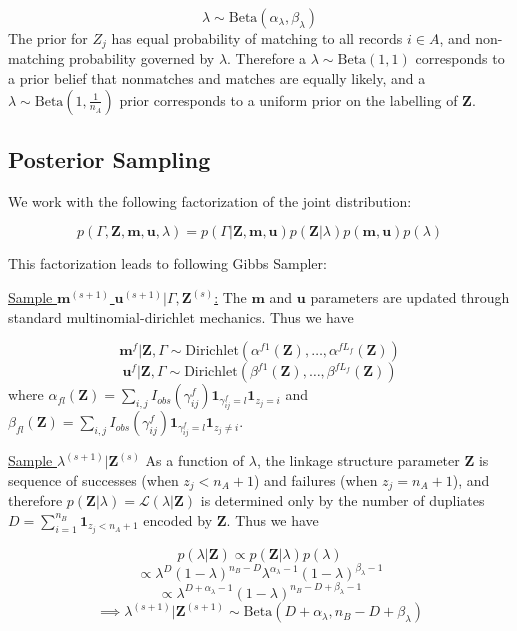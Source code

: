 \documentclass[
  12pt,
]{article}
\begin{document}
\[\lambda \sim \text{Beta}(\alpha_{\lambda}, \beta_{\lambda}) \] The
prior for \(Z_j\) has equal probability of matching to all records
\(i\in A\), and non-matching probability governed by \(\lambda\).
Therefore a \(\lambda \sim \text{Beta}(1, 1)\) corresponds to a prior
belief that nonmatches and matches are equally likely, and a
\(\lambda \sim \text{Beta}(1, \frac{1}{n_A})\) prior corresponds to a
uniform prior on the labelling of \(\mathbf{Z}\).

\hypertarget{posterior-sampling}{%
\subsection{Posterior Sampling}\label{posterior-sampling}}

We work with the following factorization of the joint distribution:

\[p(\Gamma, \mathbf{Z}, \mathbf{m}, \mathbf{u}, \lambda) = p(\Gamma|\mathbf{Z}, \mathbf{m}, \mathbf{u}) p(\mathbf{Z} | \lambda) p(\mathbf{m}, \mathbf{u}) p(\lambda)\]

This factorization leads to following Gibbs Sampler:

\underline{Sample $\mathbf{m}^{(s+1)}$ $\mathbf{u}^{(s+1)}|\Gamma, \mathbf{Z}^{(s)}$:}
The \(\mathbf{m}\) and \(\mathbf{u}\) parameters are updated through
standard multinomial-dirichlet mechanics. Thus we have

\[\mathbf{m}^f|\mathbf{Z}, \Gamma \sim \text{Dirichlet}(\alpha^{f1}(\mathbf{Z}), \ldots, \alpha^{fL_f}(\mathbf{Z}))\]
\[\mathbf{u}^f|\mathbf{Z}, \Gamma \sim \text{Dirichlet}(\beta^{f1}(\mathbf{Z}), \ldots, \beta^{fL_f}(\mathbf{Z}))\]
where
\(\alpha_{fl}(\mathbf{Z})= \sum_{i,j} I_{obs}(\gamma_{ij}^f)\mathbf{1}_{\gamma_{ij}^f = l} \mathbf{1}_{z_j = i}\)
and
\(\beta_{fl}(\mathbf{Z})= \sum_{i,j} I_{obs}(\gamma_{ij}^f)\mathbf{1}_{\gamma_{ij}^f = l} \mathbf{1}_{z_j \neq i}\).

\underline{Sample $\lambda^{(s+1)}|\mathbf{Z}^{(s)}$} As a function of
\(\lambda\), the linkage structure parameter \(\mathbf{Z}\) is sequence
of successes (when \(z_j < n_A + 1\)) and failures (when
\(z_j = n_A + 1\)), and therefore
\(p(\mathbf{Z}|\lambda) = \mathcal{L}(\lambda|\mathbf{Z})\) is
determined only by the number of dupliates
\(D = \sum_{i=1}^{n_B}\mathbf{1}_{z_j < n_A + 1}\) encoded by
\(\mathbf{Z}\). Thus we have

\[p(\lambda | \mathbf{Z}) \propto p(\mathbf{Z}|\lambda)p(\lambda)\]
\[\propto \lambda^D (1-\lambda)^{n_B - D} \lambda^{\alpha_{\lambda} -1} (1-\lambda)^{\beta_{\lambda} -1}\]
\[ \propto \lambda^{D + \alpha_{\lambda} - 1} (1-\lambda)^{n_B - D + \beta_{\lambda} -1}\]
\[\implies \lambda^{(s+1)}|\mathbf{Z}^{(s+1)} \sim \text{Beta}(D + \alpha_{\lambda}, n_B - D + \beta_{\lambda})\]
\end{document}
